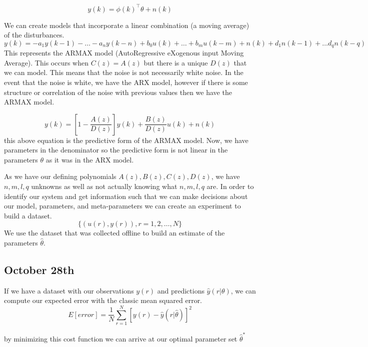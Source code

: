 \documentclass[11pt]{article}
\begin{document}
\begin{equation}
    y(k) = \phi(k)^\top \theta + n(k)
\end{equation}

We can create models that incorporate a linear combination (a moving average) of the disturbances.
\begin{equation}
    y(k) = -a_1 y(k-1) - \dots - a_n y(k-n) + b_0 u(k) + \dots + b_m u(k-m) + n(k) + d_1 n(k-1) + \dots d_q n(k-q)
\end{equation}
This represents the ARMAX model (AutoRegressive eXogenous input Moving Average).
This occurs when $C(z) = A(z)$ but there is a unique $D(z)$ that we can model.
This means that the noise is not necessarily white noise.
In the event that the noise is white, we have the ARX model, however if there is some structure or correlation of the noise with previous values then we have the ARMAX model.

\begin{equation}
    y(k) = [1-\frac{A(z)}{D(z)}] y(k) + \frac{B(z)}{D(z)} u(k) + n(k)
\end{equation}
this above equation is the predictive form of the ARMAX model.
Now, we have parameters in the denominator so the predictive form is not linear in the parameters $\theta$ as it was in the ARX model.

As we have our defining polynomials $A(z), B(z), C(z), D(z)$, we have $n,m,l,q$ unknowns as well as not actually knowing what $n,m,l,q$ are.
In order to identify our system and get information such that we can make decisions about our model, parameters, and meta-parameters we can create an experiment to build a dataset.
\begin{equation}
    \{ (u(r), y(r)), r = 1,2,\dots,N \}
\end{equation}
We use the dataset that was collected offline to build an estimate of the parameters $\hat{\theta}$.

\subsection{October 28th}
If we have a dataset with our observations $y(r)$ and predictions $\hat{y}(r|\theta)$, we can compute our expected error with the classic mean squared error.
\begin{equation}
    E[error] = \frac{1}{N} \sum_{r=1}^{N} [y(r) - \hat{y} (r | \hat{\theta})]^2
\end{equation}

by minimizing this cost function we can arrive at our optimal parameter set $\hat{\theta}^*$
\end{document}
